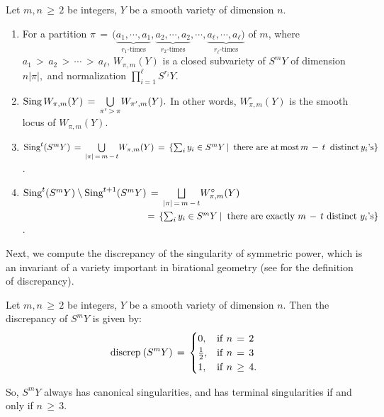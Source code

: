 \documentclass[12pt,reqno]{amsart}
\newenvironment{manualtheorem}[1]{%
\renewcommand\themanualtheoreminner{#1}%
  \manualtheoreminner
}{\endmanualtheoreminner}
\theoremstyle{definition}
\numberwithin{equation}{section}
\begin{document}
\begin{manualtheorem}{2}\label{B}
Let $ m,n\, \geq\, 2$ be integers, $Y$ be a smooth variety of dimension $n$.
\begin{enumerate}
   
\item[$(i)$] For a partition $ \pi\,=\, (\underbrace{a_{1},\cdots,a_{1}}_{r_{1}\text{-times}}, \underbrace{a_{2},\cdots,a_{2}}_{r_{2}\text{-times}},\cdots, \underbrace{a_{\ell},\cdots,a_{\ell})}_{r_{\ell}\text{-times}}$ of $m$, where $ a_{1}\,>\,a_{2}\,>\, \cdots\,>\, a_{\ell}$, $ W_{\pi,m}(Y)$ is a closed subvariety of $ S^{m}Y$ of dimension $n|\pi|,$ and normalization $ \prod_{i=1}^\ell S^{r_{i}}Y$.
\vspace{6pt}
\item[$(ii)$] $ \textnormal{Sing}\, W_{\pi,m}(Y)\,=\, \underset{\pi^{\prime}\, >\,\pi} {\bigcup}W_{\pi^{\prime},m}(Y).$ In other words, $W_{\pi,m}^{\circ}(Y)$ is the smooth locus of $ W_{\pi,m}(Y).$

\vspace{6pt}
\item[$(iii)$] $ \textnormal{Sing}^{t}(S^{m}Y)\, =\, \underset{|\pi|\,=\, m\,-\,t}{\bigcup}W_{\pi,m}(Y)\, =\, \{ \sum_{i}y_{i} \in S^{m}Y \, | \, \textnormal{ there are  at\,most}\, m\,-\,t \hspace{2pt} \textnormal{ distinct}\, y_{i}\textrm{'s}\}$.

\vspace{10pt}
\item[$(iv)$] $ \textnormal{Sing}^{t}(S^{m}Y)\setminus\textnormal{Sing}^{t+1}(S^{m}Y)\,=\, \underset{|\pi|\,=\,m\,-\,t}{\bigsqcup}W^{\circ}_{\pi,m}(Y)$ \\

$ \hspace{135pt}=\,\{ \sum_{i}y_{i}\in S^{m}Y \medspace| \medspace \textnormal{ there}  \textnormal{ are exactly $m\,-\,t$ distinct $y_{i}$\textrm{'s}} \}$.
\end{enumerate}
\end{manualtheorem}

Next, we compute the discrepancy of the singularity of symmetric power, which is an invariant of a variety important in birational geometry (see \cite{KM} for the definition of discrepancy). 

\begin{manualtheorem}{3}\label{C}
Let $ m,n \,\geq\, 2$ be integers, $Y$ be a smooth variety of dimension $n$. Then the discrepancy of $S^{m}Y$ is given by:
$$ \textnormal{discrep}\medspace (S^{m}Y)\,=\,\begin{cases} 0, &\textnormal{if}\medspace\,n\,=\,2\\
\frac{1}{2}, & \textnormal{if}\medspace\, n\,=\,3\\
1, & \textnormal{if} \medspace\, n\,\geq\,4.
\end{cases}$$

So, $S^mY$ always has canonical singularities, and has terminal singularities if and only if $n\,\geq\, 3.$
\end{manualtheorem}
\end{document}
